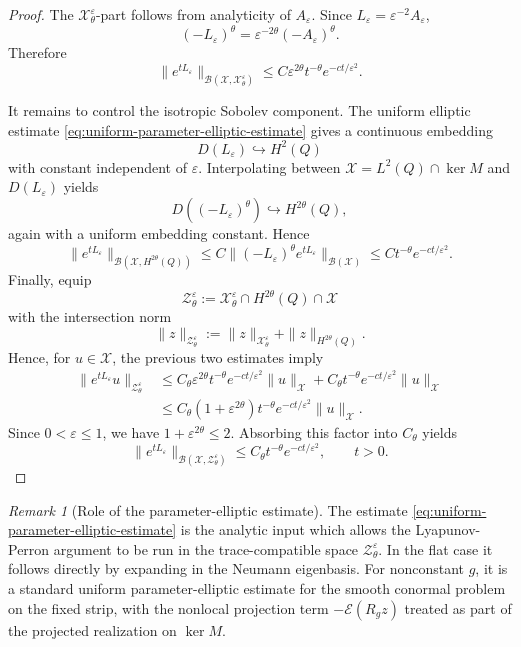 \documentclass[11pt]{article}
\theoremstyle{definition}
\theoremstyle{remark}
\newtheorem{remark}[theorem]{Remark}
\numberwithin{equation}{section}
\newcommand{\mc}[1]{\mathcal{#1}}
\begin{document}
\begin{proof}
The \(\mathcal X_\theta^\varepsilon\)-part follows from analyticity of
\(A_\varepsilon\). Since \(L_\varepsilon=\varepsilon^{-2}A_\varepsilon\),
\[
(-L_\varepsilon)^\theta
=
\varepsilon^{-2\theta}(-A_\varepsilon)^\theta.
\]
Therefore
\[
\|e^{tL_\varepsilon}\|_{\mathcal B(\mathcal X,\mathcal X_\theta^\varepsilon)}
\le
C \varepsilon^{2\theta}t^{-\theta}e^{-ct/\varepsilon^2}.
\]

It remains to control the isotropic Sobolev component. The uniform elliptic
estimate \eqref{eq:uniform-parameter-elliptic-estimate} gives a continuous
embedding
\[
D(L_\varepsilon)\hookrightarrow H^2(Q)
\]
with constant independent of \(\varepsilon\). Interpolating between
\(\mathcal X=L^2(Q)\cap\ker M\) and \(D(L_\varepsilon)\) yields
\[
D((-L_\varepsilon)^\theta)\hookrightarrow H^{2\theta}(Q),
\]
again with a uniform embedding constant. Hence
\[
\|e^{tL_\varepsilon}\|_{\mathcal B(\mathcal X,H^{2\theta}(Q))}
\le
C
\|(-L_\varepsilon)^\theta e^{tL_\varepsilon}\|_{\mathcal B(\mathcal X)}
\le
Ct^{-\theta}e^{-ct/\varepsilon^2}.
\]
Finally, equip
\[
\mc Z_\theta^\varepsilon
 :=
 \mathcal X_\theta^\varepsilon\cap H^{2\theta}(Q)\cap\mathcal X
\]
with the intersection norm
\[
\|z\|_{\mc Z_\theta^\varepsilon}
 :=
 \|z\|_{\mathcal X_\theta^\varepsilon}
 +
 \|z\|_{H^{2\theta}(Q)} .
\]
 Hence, for \(u\in\mathcal X\),
the previous two estimates imply
\[
\begin{aligned}
\|e^{tL_\varepsilon}u\|_{\mc Z_\theta^\varepsilon}
&\le
C_\theta\varepsilon^{2\theta}t^{-\theta}e^{-ct/\varepsilon^2}
\|u\|_{\mathcal X}
+
C_\theta t^{-\theta}e^{-ct/\varepsilon^2}
\|u\|_{\mathcal X}  \\
&\le
C_\theta(1+\varepsilon^{2\theta})
t^{-\theta}e^{-ct/\varepsilon^2}
\|u\|_{\mathcal X}.
\end{aligned}
\]
Since \(0<\varepsilon\le1\), we have \(1+\varepsilon^{2\theta}\le2\). Absorbing
this factor into \(C_\theta\) yields
\[
\|e^{tL_\varepsilon}\|_{\mathcal B(\mathcal X,\mc Z_\theta^\varepsilon)}
\le
C_\theta t^{-\theta}e^{-ct/\varepsilon^2},
\qquad t>0.
\]
\end{proof}


\begin{remark}[Role of the parameter-elliptic estimate]
The estimate \eqref{eq:uniform-parameter-elliptic-estimate} is the analytic
input which allows the Lyapunov-Perron argument to be run in the
trace-compatible space \(\mc Z_\theta^\varepsilon\). In the flat case it follows
directly by expanding in the Neumann eigenbasis. For nonconstant \(g\), it is a
standard uniform parameter-elliptic estimate for the smooth conormal problem on
the fixed strip, with the nonlocal projection term
\(-\mathcal E(R_gz)\) treated as part of the projected realization on
\(\ker M\).
\end{remark}
\end{document}
